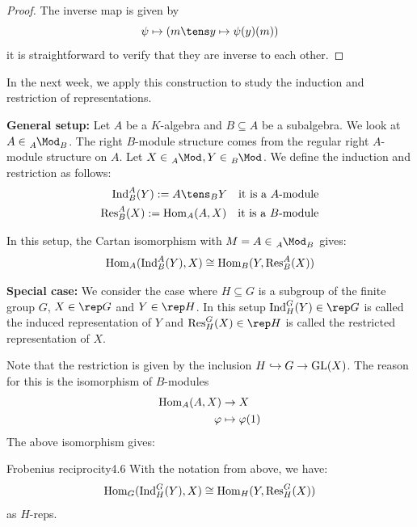 \documentclass[twoside = false,	%
		headsepline,		%
		parskip = true,
		]{scrbook}						%
\begin{document}
    \begin{proof}
        The inverse map is given by
        \begin{equation*}
            \psi \mapsto (m \tens y \mapsto \psi(y)(m))
        \end{equation*}
        it is straightforward to verify that they are inverse to each other.
    \end{proof}
    In the next week, we apply this construction to study the induction and restriction of representations.
    
    \textbf{General setup:}
        Let $A$ be a $K$-algebra and $B \subseteq A$ be a subalgebra. We look at $A \in \tensor[_A]{\Mod}{_B}$. The right $B$-module structure comes from the regular right $A$-module structure on $A$. Let $X \in \tensor[_A]{\Mod}{^{}}, Y \in \tensor[_B]{\Mod}{^{}}$. We define the induction and restriction as follows:
        \begin{equation*}
        \begin{split}
            \Ind_B^A(Y) := A \tens_B Y \quad \text{it is a $A$-module} \\
            \Res_B^A(X) := \Hom_A(A,X) \quad \text{it is a $B$-module}
        \end{split}
        \end{equation*}
    
        In this setup, the Cartan isomorphism with $M = A \in \tensor[_A]{\Mod}{_B}$ gives:
        \begin{equation*}
            \mathrm{Hom}_A(\mathrm{Ind}_B^A(Y),X) \cong \mathrm{Hom}_B(Y,\mathrm{Res}_B^A(X))
        \end{equation*}

    \textbf{Special case:}
        We consider the case where $H \subseteq G$ is a subgroup of the finite group $G$, $X \in \rep G$ and $Y \in \rep H$. In this setup $\Ind_H^G(Y) \in \rep G$ is called the induced representation of $Y$ and $\Res_H^G(X) \in \rep H$ is called the restricted representation of $X$.

        Note that the restriction is given by the inclusion $H \hookrightarrow G \to \mathrm{GL}(X)$. The reason for this is the isomorphism of $B$-modules
        \begin{equation*}
        \begin{split}
            \mathrm{Hom}_A(A,X) &\to X \\
            \varphi &\mapsto \varphi(1)
        \end{split}
        \end{equation*}
        The above isomorphism gives:
        \begin{corollary}{Frobenius reciprocity}{4.6}
            With the notation from above, we have:
            \begin{equation*}
                \mathrm{Hom}_G(\mathrm{Ind}_H^G(Y),X) \cong \mathrm{Hom}_H(Y,\mathrm{Res}_H^G(X))
            \end{equation*}
            as $H$-reps.
        \end{corollary}
\end{document}
